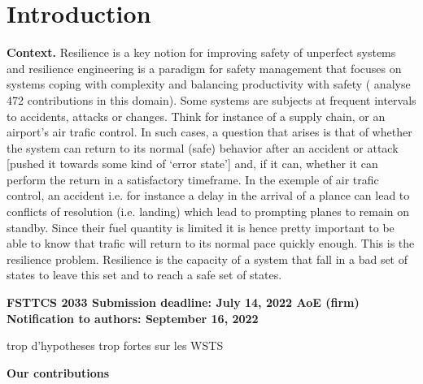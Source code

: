 \section{Introduction}\label{section introduction}


{\bf Context.} 
Resilience is a key notion for improving safety of unperfect systems and resilience engineering is a paradigm for safety management that focuses on systems coping with complexity and balancing productivity with safety (\cite{challenges} analyse 472 contributions in this domain). Some systems are subjects at frequent intervals to accidents, attacks or changes. Think for instance of a supply chain, or an airport’s air trafic control. In such cases, a question that arises is that of whether the system can return to its normal (safe) behavior after an accident or attack [pushed it towards some kind of ‘error state’] and, if it can, whether it can perform the return in a satisfactory timeframe. In the exemple of air trafic control, an accident i.e. for instance a delay in the arrival of a plance can lead to conflicts of resolution (i.e. landing) which lead to prompting planes to remain on standby. Since their fuel quantity is limited it is hence pretty important to be able to know that trafic will return to its normal pace quickly enough. This is the resilience problem. 
Resilience is the capacity of a system that fall in a bad set of states to leave this set and to reach a safe set of states.

%

{\bf FSTTCS 2033  Submission deadline: July 14, 2022 AoE (firm)
Notification to authors: September 16, 2022}

trop d'hypotheses trop fortes sur les WSTS

{\bf Our contributions}


